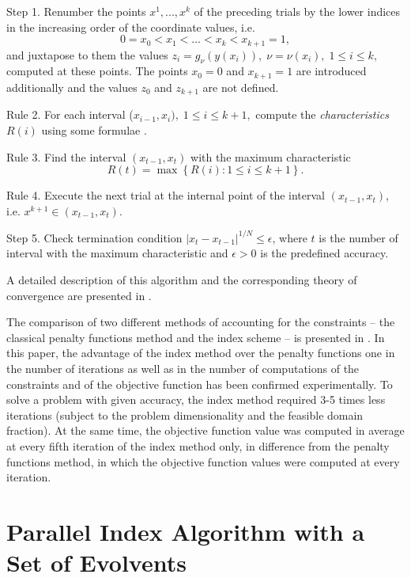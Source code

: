 \documentclass{llncs}
\begin{document}
Step 1. Renumber the points $x^1,...,x^k$ of the preceding trials by the lower indices in the 
increasing order of the coordinate values, i.e.
\[
0=x_0<x_1<\dots <x_k<x_{k+1}=1,
\]
and juxtapose to them the values $z_i=g_\nu(y(x_i)), \; \nu=\nu(x_i), \; 1 \leq i \leq k,$ computed 
at these points. The points $x_0=0$ and $x_{k+1}=1$ are introduced additionally and the 
values $z_0$ and $z_{k+1}$ are not defined.

Rule 2. For each interval ($x_{i-1},x_i), \; 1 \leq i \leq k+1,$ compute the \textit{characteristics} 
$R(i)$ using some formulae \cite{Barkalov2002}.

Rule 3. Find the interval $(x_{t-1},x_t)$ with the maximum characteristic
\begin{equation}\label{MaxR}
R(t)=\max{\left\{R(i): 1 \leq i \leq k+1\right\}}.
\end{equation}

Rule 4. Execute the next trial at the internal point of the interval $(x_{t-1},x_t)$, i.e. $x^{k+1} 
\in (x_{t-1},x_t)$.

Step 5. Check termination condition $\left|x_t-x_{t-1}\right|^{1/N}\leq \epsilon$, where $t$ is 
the number of interval with the maximum characteristic and $\epsilon > 0$ is the predefined 
accuracy.

A detailed description of this algorithm and the corresponding theory of convergence are 
presented in \cite{Strongin2000,Sergeyev2001,Barkalov2002}.

The comparison of two different methods of accounting for the constraints -- the classical 
penalty functions method and the index scheme -- is presented in \cite{Barkalov2017}. In 
this paper, the advantage of the index method over the penalty functions one in the number of 
iterations as well as in the number of computations of the constraints and of the objective 
function has been confirmed experimentally. To solve a problem with given accuracy, the index 
method required 3-5 times less iterations (subject to the problem dimensionality and the feasible 
domain fraction). At the same time, the objective function value was computed in average at 
every fifth iteration of the index method only, in difference from the penalty functions method, 
in which the objective function values were computed at every iteration.


\section{Parallel Index Algorithm with a Set of Evolvents}
\label{sec:3}
\end{document}
